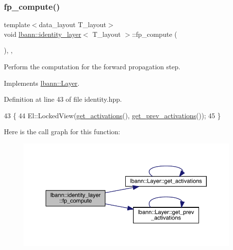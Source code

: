 \subsubsection{\texorpdfstring{fp\+\_\+compute()}{fp\_compute()}}
{\footnotesize\ttfamily template$<$data\+\_\+layout T\+\_\+layout$>$ \\
void \hyperlink{classlbann_1_1identity__layer}{lbann\+::identity\+\_\+layer}$<$ T\+\_\+layout $>$\+::fp\+\_\+compute (\begin{DoxyParamCaption}{ }\end{DoxyParamCaption})\hspace{0.3cm}{\ttfamily [inline]}, {\ttfamily [override]}, {\ttfamily [virtual]}}

Perform the computation for the forward propagation step. 

Implements \hyperlink{classlbann_1_1Layer_a523319dd1bd87a0612afa1912bb5aad7}{lbann\+::\+Layer}.



Definition at line 43 of file identity.\+hpp.


\begin{DoxyCode}
43                              \{
44     El::LockedView(\hyperlink{classlbann_1_1Layer_a1134b1a4385af199d7272c5aa827fa99}{get\_activations}(), \hyperlink{classlbann_1_1Layer_a45853df73a2e72bfaa774665a0f37ed7}{get\_prev\_activations}());
45   \}
\end{DoxyCode}
Here is the call graph for this function\+:\nopagebreak
\begin{figure}[H]
\begin{center}
\leavevmode
\includegraphics[width=350pt]{classlbann_1_1identity__layer_aaa19914b20bc409aa3fb8a744e994114_cgraph}
\end{center}
\end{figure}
\mbox{\label{classlbann_1_1identity__layer_a89b5c86ca801ce0f4854bf9d6b1a50e9}} 
